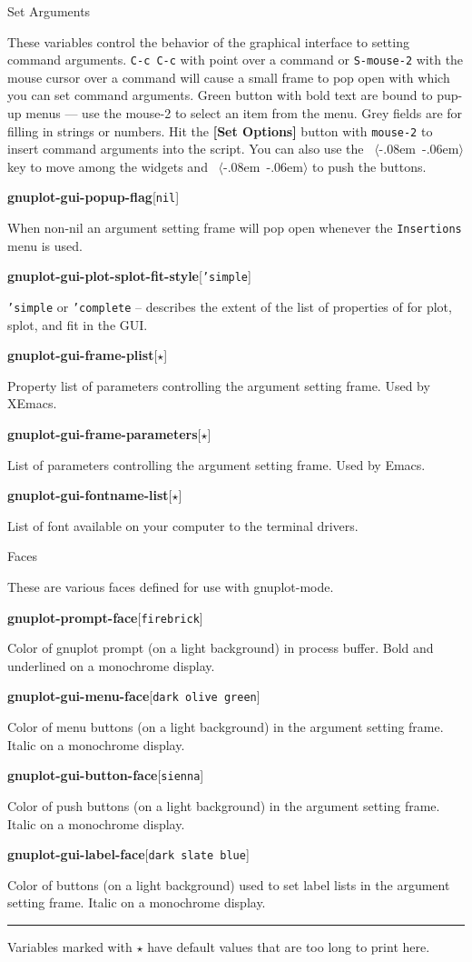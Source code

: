 \documentclass[twocolumn]{article}
\newenvironment{Boxedminipage}%
{\begin{Sbox}\begin{minipage}}%
  {\end{minipage}\end{Sbox}\Ovalbox{\TheSbox}}
\def\key#1{{\textrm \leavevmode\hbox{%
  \raise0.4pt\hbox{$\langle$}\kern-.08em\vtop{%
    \vbox{\hrule\kern-0.4pt
     \hbox{\raise0.4pt\hbox{\vphantom{$\langle$}}#1}}%
    \kern-0.4pt\hrule}%
  \kern-.06em\raise0.4pt\hbox{$\rangle$}}}}
\def\variable#1#2#3{{
    \vspace{-0.2truecm}
    \begin{flushright}
      \begin{minipage}[h]{0.97\linewidth}
        \vspace{-0.2truecm}
        \textbf{#1}\hfill[\texttt{#2}]
        \begin{flushright}
          \begin{minipage}[h]{0.93\linewidth}
            \vspace{-0.2truecm}
            #3
          \end{minipage}
        \end{flushright}
      \end{minipage}
    \end{flushright}
    }}
\def\Star{{$\star$}}
\begin{document}
\begin{center}
  \begin{Boxedminipage}{0.75\linewidth}
    \begin{center}
      {\large Set Arguments}
    \end{center}
  \end{Boxedminipage}
\end{center}

\noindent These variables control the behavior of the graphical
interface to setting command arguments.  \texttt{C-c C-c} with point
over a command or \texttt{S-mouse-2} with the mouse cursor over a
command will cause a small frame to pop open with which you can set
command arguments.  Green button with bold text are bound to pup-up
menus --- use the mouse-2 to select an item from the menu.  Grey fields
are for filling in strings or numbers.  Hit the \textbf{[Set Options]}
button with \texttt{mouse-2} to insert command arguments into the
script.  You can also use the \key{tab} key to move among the widgets
and \key{ret} to push the buttons.

\vspace{2ex}
%
\variable{gnuplot-gui-popup-flag}{nil}{When non-nil an argument
setting frame will pop open whenever the \texttt{Insertions} menu is
used.}
%
\variable{gnuplot-gui-plot-splot-fit-style}{'simple}{\texttt{'simple}
  or \texttt{'complete} -- describes the extent of the list of
  properties of for plot, splot, and fit in the GUI.}
%
\variable{gnuplot-gui-frame-plist}{\Star}{Property list of parameters
  controlling the argument setting frame.  Used by XEmacs.}
%
\variable{gnuplot-gui-frame-parameters}{\Star}{List of parameters
  controlling the argument setting frame.  Used by Emacs.}
%
\variable{gnuplot-gui-fontname-list}{\Star}{List of font available on your
  computer to the terminal drivers.}
%


\begin{center}
  \begin{Boxedminipage}{0.75\linewidth}
    \begin{center}
      {\large Faces}
    \end{center}
  \end{Boxedminipage}
\end{center}

\noindent These are various faces defined for use with gnuplot-mode.
\vspace{2ex}

%
\variable{gnuplot-prompt-face}{firebrick}{Color of gnuplot prompt (on a
  light background) in process buffer.  Bold and underlined on a
  monochrome display.}
%
\variable{gnuplot-gui-menu-face}{dark olive green}{Color of menu
  buttons (on a light background) in the argument setting frame.
  Italic on a monochrome display.}
%
\variable{gnuplot-gui-button-face}{sienna}{Color of push buttons (on a
  light background) in the argument setting frame.  Italic on a
  monochrome display.}
%
\variable{gnuplot-gui-label-face}{dark slate blue}{Color of buttons (on
  a light background) used to set label lists in the argument setting
  frame.  Italic on a monochrome display.}
%

\vfill
\hrule
\vspace{0.5ex}
\begin{flushleft}
  \footnotesize{Variables marked with {\Star} have default values that
    are too long to print here.}
\end{flushleft}
\end{document}

